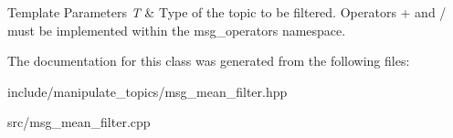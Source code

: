 \begin{DoxyTemplParams}{Template Parameters}
{\em T} & Type of the topic to be filtered. Operators + and / must be implemented within the msg\+\_\+operators namespace. \\
\hline
\end{DoxyTemplParams}


The documentation for this class was generated from the following files\+:\begin{DoxyCompactItemize}
\item 
include/manipulate\+\_\+topics/msg\+\_\+mean\+\_\+filter.\+hpp\item 
src/msg\+\_\+mean\+\_\+filter.\+cpp\end{DoxyCompactItemize}
